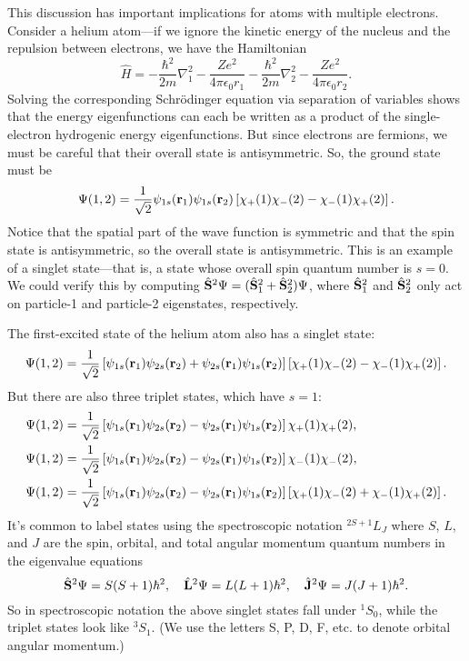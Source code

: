 \documentclass[../p052main.tex]{subfiles}
\begin{document}
This discussion has important implications for atoms with multiple electrons.
Consider a helium atom---if we ignore the kinetic energy of the nucleus and the repulsion between electrons, we have the Hamiltonian
\[ \hat H = -\frac{\hbar^2}{2m} \nabla_1^2 - \frac{Ze^2}{4\pi \epsilon_0 r_1} - \frac{\hbar^2}{2m} \nabla_2^2 - \frac{Ze^2}{4\pi \epsilon_0 r_2}. \]
Solving the corresponding Schrödinger equation via separation of variables shows that the energy eigenfunctions can each be written as a product of the single-electron hydrogenic energy eigenfunctions.
But since electrons are fermions, we must be careful that their overall state is antisymmetric.
So, the ground state must be
\[ \Psi(1,2) = \frac{1}{\sqrt{2}} \psi_{1s}(\mathbf{r}_1) \psi_{1s}(\mathbf{r}_2) \left[ \chi_+(1) \chi_-(2) - \chi_-(1) \chi_+(2) \right]. \]
Notice that the spatial part of the wave function is symmetric and that the spin state is antisymmetric, so the overall state is antisymmetric.
This is an example of a singlet state---that is, a state whose overall spin quantum number is $s = 0$.
We could verify this by computing $\hat{\mathbf{S}}^2 \Psi = (\hat{\mathbf{S}}_1^2 + \hat{\mathbf{S}}_2^2) \Psi$, where $\hat{\mathbf{S}}_1^2$ and $\hat{\mathbf{S}}_2^2$ only act on particle-1 and particle-2 eigenstates, respectively.

The first-excited state of the helium atom also has a singlet state:
\[ \Psi(1,2) = \frac{1}{\sqrt{2}} \left[ \psi_{1s}(\mathbf{r}_1)\psi_{2s}(\mathbf{r}_2) + \psi_{2s}(\mathbf{r}_1)\psi_{1s}(\mathbf{r}_2) \right] \left[ \chi_+(1) \chi_-(2) - \chi_-(1) \chi_+(2) \right]. \]
But there are also three triplet states, which have $s = 1$:
\begin{align*}
    \Psi(1,2) &= \frac{1}{\sqrt{2}} \left[ \psi_{1s}(\mathbf{r}_1)\psi_{2s}(\mathbf{r}_2) - \psi_{2s}(\mathbf{r}_1)\psi_{1s}(\mathbf{r}_2) \right] \chi_+(1) \chi_+(2), \\
    \Psi(1,2) &= \frac{1}{\sqrt{2}} \left[ \psi_{1s}(\mathbf{r}_1)\psi_{2s}(\mathbf{r}_2) - \psi_{2s}(\mathbf{r}_1)\psi_{1s}(\mathbf{r}_2) \right] \chi_-(1) \chi_-(2), \\
    \Psi(1,2) &= \frac{1}{\sqrt{2}} \left[ \psi_{1s}(\mathbf{r}_1)\psi_{2s}(\mathbf{r}_2) - \psi_{2s}(\mathbf{r}_1)\psi_{1s}(\mathbf{r}_2) \right] \left[ \chi_+(1) \chi_-(2) + \chi_-(1) \chi_+(2) \right].
\end{align*}
It's common to label states using the spectroscopic notation $^{2S+1}L_{J}$ where $S$, $L$, and $J$ are the spin, orbital, and total angular momentum quantum numbers in the eigenvalue equations
\[ \hat{\mathbf{S}}^2 \Psi = S(S+1)\hbar^2, \quad \hat{\mathbf{L}}^2 \Psi = L(L+1)\hbar^2, \quad \hat{\mathbf{J}}^2 \Psi = J(J+1)\hbar^2. \]
So in spectroscopic notation the above singlet states fall under $^1S_0$, while the triplet states look like $^3S_1$.
(We use the letters S, P, D, F, etc. to denote orbital angular momentum.)
\end{document}
